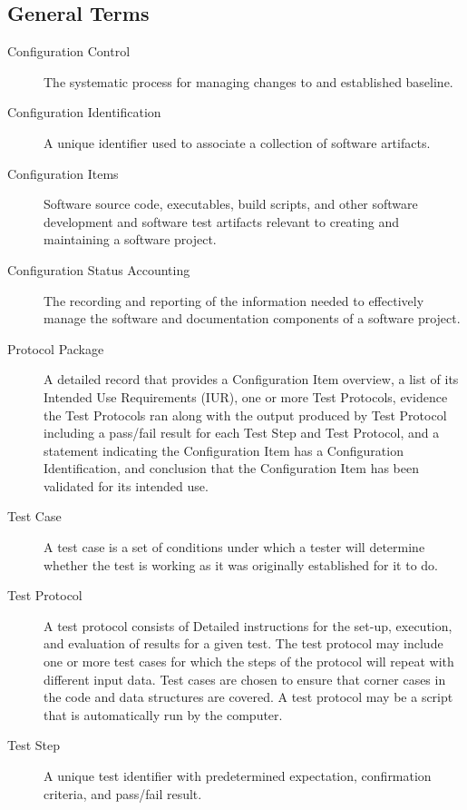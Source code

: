 \subsection{General Terms}
\begin{description}

\item[Configuration Control] \quad The systematic process for managing changes
  to and established baseline.

\item[Configuration Identification] \quad A unique identifier used to associate
  a collection of software artifacts.

\item[Configuration Items] \quad Software source code, executables, build
  scripts, and other software development and software test artifacts relevant
  to creating and maintaining a software project.

\item[Configuration Status Accounting] \quad The recording and reporting of the
  information needed to effectively manage the software and documentation
  components of a software project.

\item[Protocol Package] \quad A detailed record that provides a Configuration
  Item overview, a list of its Intended Use Requirements (IUR), one or more Test
  Protocols, evidence the Test Protocols ran along with the output produced by
  Test Protocol including a pass/fail result for each Test Step and Test
  Protocol, and a statement indicating the Configuration Item has
  a Configuration Identification, and conclusion that the Configuration Item has
  been validated for its intended use.

\item[Test Case] \quad A test case is a set of conditions under which a tester
  will determine whether the test is working as it was originally established
  for it to do.

\item[Test Protocol] \quad A test protocol consists of Detailed instructions for
  the set-up, execution, and evaluation of results for a given test.  The test
  protocol may include one or more test cases for which the steps of the
  protocol will repeat with different input data. Test cases are chosen to
  ensure that corner cases in the code and data structures are covered. A test
  protocol may be a script that is automatically run by the computer.

\item[Test Step] \quad A unique test identifier with predetermined expectation,
  confirmation criteria, and pass/fail result.

\end{description}
